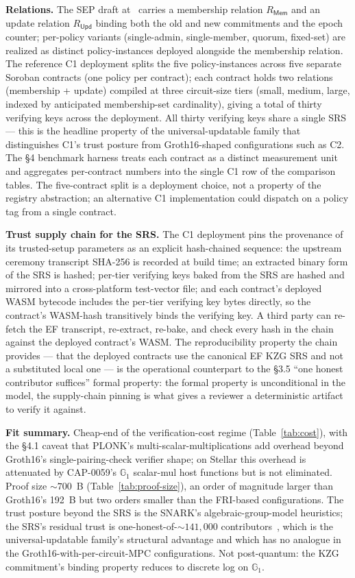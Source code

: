 \textbf{Relations.} The SEP draft at~\cite{sep-onym} carries a
membership relation $R_{\mathsf{Mem}}$ and an update relation
$R_{\mathsf{Upd}}$ binding both the old and new commitments and the
epoch counter; per-policy variants (single-admin, single-member,
quorum, fixed-set) are realized as distinct policy-instances
deployed alongside the membership relation. The reference C1
deployment splits the five policy-instances across five separate
Soroban contracts (one policy per contract); each contract holds
two relations (membership + update) compiled at three circuit-size
tiers (small, medium, large, indexed by anticipated membership-set
cardinality), giving a total of thirty verifying keys across the
deployment. All thirty verifying keys share a single SRS --- this
is the headline property of the universal-updatable family that
distinguishes C1's trust posture from Groth16-shaped configurations
such as C2. The §4 benchmark harness treats each contract as a
distinct measurement unit and aggregates per-contract numbers into
the single C1 row of the comparison tables. The five-contract
split is a deployment choice, not a property of the registry
abstraction; an alternative C1 implementation could dispatch on a
policy tag from a single contract.

\textbf{Trust supply chain for the SRS.} The C1 deployment pins the
provenance of its trusted-setup parameters as an explicit
hash-chained sequence: the upstream ceremony transcript SHA-256 is
recorded at build time; an extracted binary form of the SRS is
hashed; per-tier verifying keys baked from the SRS are hashed and
mirrored into a cross-platform test-vector file; and each contract's
deployed WASM bytecode includes the per-tier verifying key bytes
directly, so the contract's WASM-hash transitively binds the
verifying key. A third party can re-fetch the EF transcript,
re-extract, re-bake, and check every hash in the chain against the
deployed contract's WASM. The reproducibility property the chain
provides --- that the deployed contracts use the canonical EF KZG
SRS and not a substituted local one --- is the operational
counterpart to the §3.5 ``one honest contributor suffices'' formal
property: the formal property is unconditional in the model, the
supply-chain pinning is what gives a reviewer a deterministic
artifact to verify it against.

\textbf{Fit summary.} Cheap-end of the verification-cost regime
(Table~\ref{tab:cost}), with the §4.1 caveat that PLONK's
multi-scalar-multiplications add overhead beyond Groth16's
single-pairing-check verifier shape; on Stellar this overhead is
attenuated by CAP-0059's $\mathbb{G}_1$ scalar-mul host functions
but is not eliminated. Proof size ${\sim}700$~B
(Table~\ref{tab:proof-size}), an order of magnitude larger than
Groth16's 192~B but two orders smaller than the FRI-based
configurations. The trust posture beyond the SRS is the
SNARK's algebraic-group-model heuristics; the SRS's residual trust
is one-honest-of-${\sim}141{,}000$ contributors~\cite{eth-kzg-ceremony},
which is the universal-updatable family's structural advantage and
which has no analogue in the Groth16-with-per-circuit-MPC
configurations. Not post-quantum: the KZG commitment's binding
property reduces to discrete log on $\mathbb{G}_1$.

